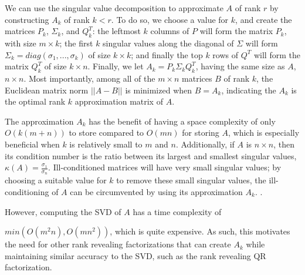 We can use the singular value decomposition to approximate $A$ of rank $r$ by constructing $A_k$ of rank $k < r$. To do so, we choose a value for $k$, and create the matrices $P_k$, $\Sigma_k$, and $Q^{T}_{k}$: the leftmost $k$ columns of $P$ will form the matrix $P_k$, with size $m \times k$; the first $k$ singular values along the diagonal of $\Sigma$ will form $\Sigma_k = diag(\sigma_1, ..., \sigma_k)$ of size $k \times k$; and finally the top $k$ rows of $Q^{T}$ will form the matrix $Q^{T}_{k}$ of size $k \times n$. Finally, we let $A_{k} = P_{k}\Sigma_{k}Q^{T}_{k}$, having the same size as $A$, $n \times n$. %
Most importantly, among all of the $m \times n$ matrices $B$ of rank $k$, the Euclidean matrix norm $||A-B||$ is minimized when $B=A_k$, indicating the $A_k$ is the optimal rank $k$ approximation matrix of $A$. \cite{appliedLinearAlgebra}

The approximation $A_k$ has the benefit of having a space complexity of only $O(k(m + n))$ to store compared to $O(mn)$ for storing $A$, which is especially beneficial when $k$ is relatively small to $m$ and $n$. %
Additionally, if $A$ is $n \times n$, then its condition number is the ratio between its largest and smallest singular values, $\kappa(A) = \frac{\sigma_1}{\sigma_n}$. \cite{appliedLinearAlgebra} Ill-conditioned matrices will have very small singular values; by choosing a suitable value for $k$ to remove these small singular values, the ill-conditioning of $A$ can be circumvented by using its approximation $A_k$. \cite{appliedLinearAlgebra}.

However, computing the SVD of $A$ has a time complexity of

\noindent $min(O(m^{2}n), O(mn^{2}))$, which is quite expensive. %
As such, this motivates the need for other rank revealing factorizations that can create $A_k$ while maintaining similar accuracy to the SVD, such as the rank revealing QR factorization.